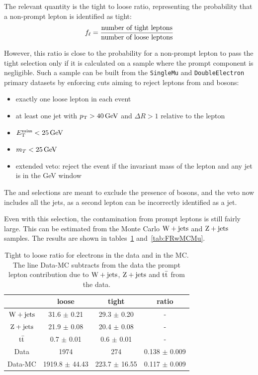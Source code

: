 The relevant quantity is the tight to loose ratio, representing the
probability that a non-prompt lepton is identified as tight:
\begin{equation*}
    f_{\mathrm{\ell}} = \dfrac{\text{number of tight leptons}}{\text{number of loose
    leptons}}
\end{equation*}

However, this ratio is close to the probability for a non-prompt lepton to
pass the tight selection only if it is calculated on a sample where the
prompt component is negligible. Such a sample can be built from the
\texttt{SingleMu} and \texttt{DoubleElectron} primary datasets by enforcing
cuts aiming to reject leptons from \W and \Z bosons:
\begin{itemize}
    \item exactly one loose lepton in each event
    \item at least one jet with $\pt > \unit[40]{GeV}$ and $\Delta R > 1$
        relative to the lepton
    \item $\met < \unit[25]{GeV}$
    \item $\mt < \unit[25]{GeV}$
    \item extended \Z veto: reject the event if the invariant mass of the
        lepton and any jet is in the \unit[76-106]{GeV} window
\end{itemize}
The \met and \mt selections are meant to exclude the presence of \W bosons,
and the \Z veto now includes all the jets, as a second lepton can be incorrectly
identified as a jet.

Even with this selection, the contamination from prompt leptons is still
fairly large. This can be estimated from the Monte Carlo $\mathrm{W} + \text{jets}$ and
$\mathrm{Z} + \text{jets}$ samples. The results are shown in
tables~\ref{tab:FRwMCEl} and~\ref{tab:FRwMCMu}.
\begin{table}[htb]
\begin{center}
\begin{tabular}{*4c}
    \toprule
 & 	 loose & 	 tight & 	 ratio \\
 \midrule
 $\mathrm{W} + \text{jets}$ & 	31.6 $\pm$ 0.21 & 	29.3 $\pm$ 0.20 & 	     -     \\
$\mathrm{Z} + \text{jets}$ & 	21.9 $\pm$ 0.08 & 	20.4 $\pm$ 0.08 & 	     -     \\
$\mathrm{t}\bar{\mathrm{t}}$ & 	 0.7 $\pm$ 0.01 & 	 0.6 $\pm$ 0.01 & 	     -     \\
\midrule
Data & 	 1974 & 	  274 & 	0.138 $\pm$ 0.009 \\
Data-MC &	1919.8 $\pm$ 44.43 & 	223.7 $\pm$ 16.55 & 	0.117 $\pm$ 0.009 \\
\bottomrule
\end{tabular}
\caption{Tight to loose ratio for electrons in the data and in the MC. The line
    Data-MC subtracts from the data the prompt lepton contribution due to
    $\mathrm{W} + \text{jets}$, 
$\mathrm{Z} + \text{jets}$ and $\mathrm{t}\bar{\mathrm{t}}$ from the data.}
\label{tab:FRwMCEl}
\end{center}
\end{table}

